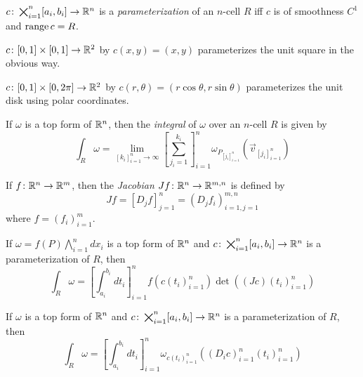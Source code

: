 \documentclass[notes.tex]{subfiles}
\begin{document}
\begin{definition}
    $c\colon \bigtimes_{i = 1}^n [a_i, b_i] \to \mathbb{R}^n$ is a \textit{parameterization} of an $n$-cell $R$ iff $c$ is of smoothness $C^1$ and $\operatorname{range} c = R$.
\end{definition}

\begin{example}
    $c\colon [0, 1] \times [0, 1] \to \mathbb{R}^2$ by $c(x, y) = (x, y)$ parameterizes the unit square in the obvious way.
\end{example}

\begin{example}
    $c\colon [0, 1] \times [0, 2\pi] \to \mathbb{R}^2$ by $c(r, \theta) = (r\cos\theta, r\sin\theta)$ parameterizes the unit disk using polar coordinates.
\end{example}

\begin{definition}
    If $\omega$ is a top form of $\mathbb{R}^n$, then the \textit{integral} of $\omega$ over an $n$-cell $R$ is given by
    \[
        \int_R \omega = \lim_{[k_i]_{i = 1}^n \to \infty} \left[ \sum_{j_i = 1}^{k_i} \right]_{i = 1}^n \omega_{P_{[j_i]_{i = 1}^n}}(\vec{v}_{[j_i]_{i = 1}^n})
    \]
\end{definition}

\begin{definition}[Jacobian]
    If $f\colon \mathbb{R}^n \to \mathbb{R}^m$, then the \textit{Jacobian} $Jf\colon \mathbb{R}^n \to \mathbb{R}^{m, n}$ is defined by
    \[
        Jf = [ D_j f ]_{j = 1}^n = ( D_j f_i )_{i = 1, j = 1}^{m, n}
    \]
    where $f = (f_i)_{i = 1}^m$.
\end{definition}

\begin{theorem}
    If $\omega = f(P)\bigwedge_{i = 1}^n dx_i$ is a top form of $\mathbb{R}^n$ and $c\colon \bigtimes_{i = 1}^n [a_i, b_i] \to \mathbb{R}^n$ is a parameterization of $R$, then
    \[
        \int_R \omega = \left[ \int_{a_i}^{b_i} dt_i \right]_{i = 1}^n f(c(t_i)_{i = 1}^n) \det((Jc)(t_i)_{i = 1}^n)
    \]
\end{theorem}

\begin{theorem}
    If $\omega$ is a top form of $\mathbb{R}^n$ and $c\colon \bigtimes_{i = 1}^n [a_i, b_i] \to \mathbb{R}^n$ is a parameterization of $R$, then
    \[
        \int_R \omega = \left[ \int_{a_i}^{b_i} dt_i \right]_{i = 1}^n \omega_{c(t_i)_{i = 1}^n}((D_i c)_{i = 1}^n(t_i)_{i = 1}^n)
    \]
\end{theorem}
\end{document}
